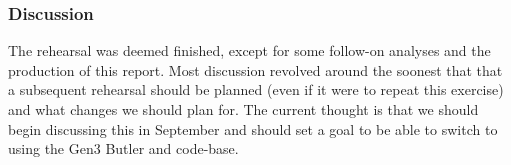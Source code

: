 \subsubsection{Discussion}

The rehearsal was deemed finished, except for some follow-on analyses and
the production of this report.  Most discussion revolved around the soonest that
that a subsequent rehearsal should be planned (even if it were to repeat this
exercise) and what changes we should plan for.  The current thought is that we
should begin discussing this in September and should set a goal to be able to
switch to using the Gen3 Butler and code-base.



